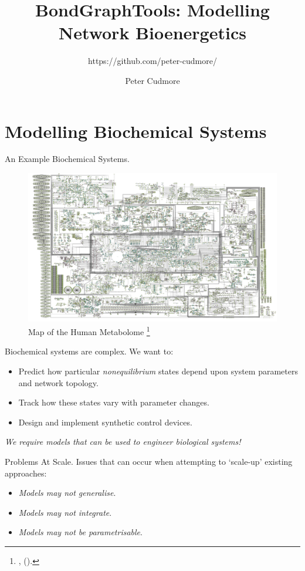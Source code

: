 \documentclass[11pt,reqno]{beamer}
\title{BondGraphTools: Modelling Network Bioenergetics}
\author{Peter Cudmore}
\subtitle{https://github.com/peter-cudmore/}
\date{}
\newcommand{\fcite}[1]{
\footnote{\tiny\cite{#1}, (\citeyear{#1}).}
}
\begin{document}
\begin{frame}
\titlepage
\addtocounter{framenumber}{-1} 
\end{frame}
\section{Modelling Biochemical Systems}
\begin{frame}{An Example Biochemical Systems.}
\begin{figure}
\includegraphics[width=0.8\linewidth]{map.png}
\caption{Map of the Human Metabolome\fcite{HMDB}}
\end{figure}
\end{frame}

\begin{frame}{Biochemical systems are complex.}
We want to:
\begin{itemize}
	\item Predict how particular \emph{nonequilibrium} states depend upon system parameters and network topology.
	\item Track how these states vary with parameter changes.
	\item Design and implement synthetic control devices.
\end{itemize}
\vspace{20pt}

\emph{We require models that can be used to engineer biological systems!}
\end{frame}

\begin{frame}{Problems At Scale.}
Issues that can occur when attempting to `scale-up' existing approaches:
\begin{itemize}
	\item<2-> \emph{Models may not generalise}.
	\item<3-> \emph{Models may not integrate}.
	\item<4-> \emph{Models may not be parametrisable}.
\end{itemize}
\vfill
{}
\end{frame}
\end{document}
